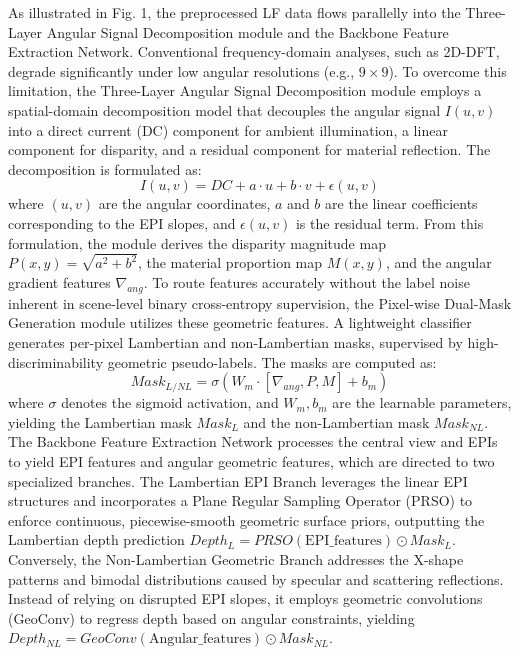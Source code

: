 \documentclass[lettersize,journal]{IEEEtran}
\begin{document}
As illustrated in Fig. 1, the preprocessed LF data flows parallelly into the Three-Layer Angular Signal Decomposition module and the Backbone Feature Extraction Network. Conventional frequency-domain analyses, such as 2D-DFT, degrade significantly under low angular resolutions (e.g., $9 \times 9$). To overcome this limitation, the Three-Layer Angular Signal Decomposition module employs a spatial-domain decomposition model that decouples the angular signal $I(u,v)$ into a direct current (DC) component for ambient illumination, a linear component for disparity, and a residual component for material reflection. The decomposition is formulated as:
\begin{equation}
I(u,v) = DC + a \cdot u + b \cdot v + \epsilon(u,v)
\end{equation}
where $(u,v)$ are the angular coordinates, $a$ and $b$ are the linear coefficients corresponding to the EPI slopes, and $\epsilon(u,v)$ is the residual term. From this formulation, the module derives the disparity magnitude map $P(x,y) = \sqrt{a^2 + b^2}$, the material proportion map $M(x,y)$, and the angular gradient features $\nabla_{ang}$. To route features accurately without the label noise inherent in scene-level binary cross-entropy supervision, the Pixel-wise Dual-Mask Generation module utilizes these geometric features. A lightweight classifier generates per-pixel Lambertian and non-Lambertian masks, supervised by high-discriminability geometric pseudo-labels. The masks are computed as:
\begin{equation}
Mask_{L/NL} = \sigma(W_m \cdot [\nabla_{ang}, P, M] + b_m)
\end{equation}
where $\sigma$ denotes the sigmoid activation, and $W_m, b_m$ are the learnable parameters, yielding the Lambertian mask $Mask_L$ and the non-Lambertian mask $Mask_{NL}$. The Backbone Feature Extraction Network processes the central view and EPIs to yield EPI features and angular geometric features, which are directed to two specialized branches. The Lambertian EPI Branch leverages the linear EPI structures and incorporates a Plane Regular Sampling Operator (PRSO) to enforce continuous, piecewise-smooth geometric surface priors, outputting the Lambertian depth prediction $Depth_L = PRSO(\text{EPI\_features}) \odot Mask_L$. Conversely, the Non-Lambertian Geometric Branch addresses the X-shape patterns and bimodal distributions caused by specular and scattering reflections. Instead of relying on disrupted EPI slopes, it employs geometric convolutions (GeoConv) to regress depth based on angular constraints, yielding $Depth_{NL} = GeoConv(\text{Angular\_features}) \odot Mask_{NL}$.
\end{document}

